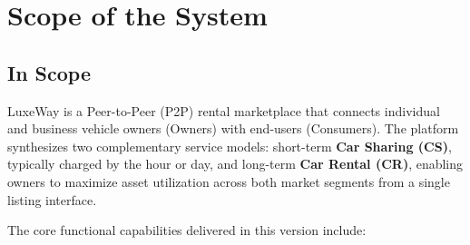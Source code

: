 \section{Scope of the System}

\subsection{In Scope}

LuxeWay is a Peer-to-Peer (P2P) rental marketplace that connects individual and business vehicle owners (Owners) with end-users (Consumers). The platform synthesizes two complementary service models: short-term \textbf{Car Sharing (CS)}, typically charged by the hour or day, and long-term \textbf{Car Rental (CR)}, enabling owners to maximize asset utilization across both market segments from a single listing interface.

The core functional capabilities delivered in this version include:

